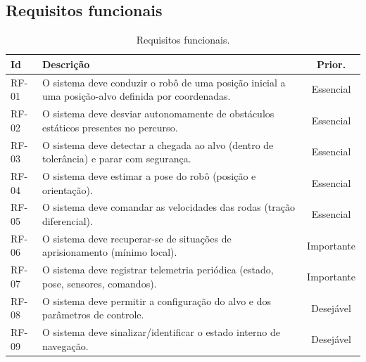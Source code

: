 \subsection{Requisitos funcionais}
\begin{table}[H]\centering
\caption{Requisitos funcionais.}
\renewcommand{\arraystretch}{1.2}
\begin{tabularx}{\textwidth}{@{}l X c@{}}
\toprule
\textbf{Id} & \textbf{Descrição} & \textbf{Prior.} \\
\midrule
RF-01 & O sistema deve conduzir o robô de uma posição inicial a uma posição-alvo definida por coordenadas. & Essencial \\
RF-02 & O sistema deve desviar autonomamente de obstáculos estáticos presentes no percurso. & Essencial \\
RF-03 & O sistema deve detectar a chegada ao alvo (dentro de tolerância) e parar com segurança. & Essencial \\
RF-04 & O sistema deve estimar a pose do robô (posição e orientação). & Essencial \\
RF-05 & O sistema deve comandar as velocidades das rodas (tração diferencial). & Essencial \\
RF-06 & O sistema deve recuperar-se de situações de aprisionamento (mínimo local). & Importante \\
RF-07 & O sistema deve registrar telemetria periódica (estado, pose, sensores, comandos). & Importante \\
RF-08 & O sistema deve permitir a configuração do alvo e dos parâmetros de controle. & Desejável \\
RF-09 & O sistema deve sinalizar/identificar o estado interno de navegação. & Desejável \\
\bottomrule
\end{tabularx}
\end{table}


